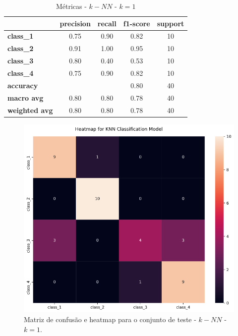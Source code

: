 \documentclass[
	article,			%
	11pt,				%
	oneside,			%
	a4paper,			%
	english,			%
	brazil,				%
	sumario=tradicional
	]{abntex2}
\begin{document}
\begin{table}[H]
\centering
\begin{tabular}{l|c|c|c|c|}
\cline{2-5}
                                            & \multicolumn{1}{l|}{\textbf{precision}} & \textbf{recall} & \textbf{f1-score} & \textbf{support} \\ \hline
\multicolumn{1}{|l|}{\textbf{class\_1}}     & 0.75                                    & 0.90            & 0.82              & 10               \\ \hline
\multicolumn{1}{|l|}{\textbf{class\_2}}     & 0.91                                    & 1.00            & 0.95              & 10               \\ \hline
\multicolumn{1}{|l|}{\textbf{class\_3}}     & 0.80                                    & 0.40            & 0.53              & 10               \\ \hline
\multicolumn{1}{|l|}{\textbf{class\_4}}     & 0.75                                    & 0.90            & 0.82              & 10               \\ \hline
\multicolumn{1}{|l|}{\textbf{accuracy}}     &                                         &                 & 0.80              & 40               \\ \hline
\multicolumn{1}{|l|}{\textbf{macro avg}}    & 0.80                                    & 0.80            & 0.78              & 40               \\ \hline
\multicolumn{1}{|l|}{\textbf{weighted avg}} & 0.80                                    & 0.80            & 0.78              & 40               \\ \hline
\end{tabular}
\caption{Métricas - $k-NN$ - $k=1$}
\label{tab:knn_02}
\end{table}

\begin{figure}[H]
 \centering
 \includegraphics[scale=0.35]{fig/knn_cm02.png}
 \caption{Matriz de confusão e heatmap para o conjunto de teste - $k-NN$ - $k=1$.}
 \label{fig:knn_cm02}
\end{figure}
\end{document}
